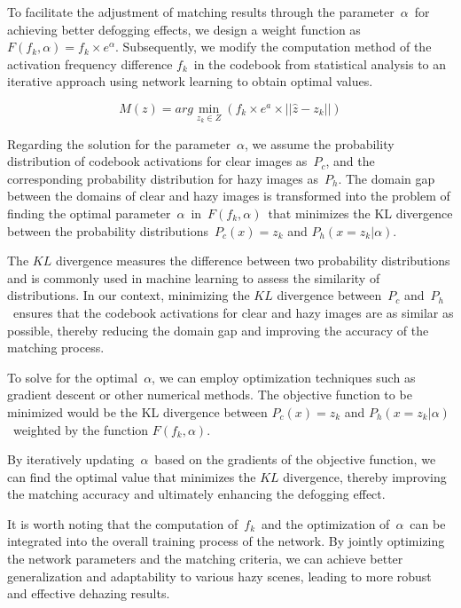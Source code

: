 \documentclass[lettersize,journal]{IEEEtran}
\begin{document}
To facilitate the adjustment of matching results through the parameter $\alpha$ for achieving better defogging effects, we design a weight function as $F(f_{k}, \alpha) = f_{k} \times e^{\alpha} $. Subsequently, we modify the computation method of the activation frequency difference $f_{k}$ in the codebook from statistical analysis to an iterative approach using network learning to obtain optimal values.

\begin{equation}
	\label{codebook_matching_equation_1}
	M(z) = arg \min_{z_{k} \in Z} (f_{k} \times e^{a} \times || \widehat{z} - z_{k} ||)
\end{equation}

Regarding the solution for the parameter $\alpha$, we assume the probability distribution of codebook activations for clear images as $P_{c}$, and the corresponding probability distribution for hazy images as $P_{h}$. The domain gap between the domains of clear and hazy images is transformed into the problem of finding the optimal parameter $\alpha$ in $F(f_{k}, \alpha)$ that minimizes the KL divergence between the probability distributions $P_{c}(x) = z_{k}$ and $P_{h}(x = z_{k} | \alpha) $.


The $KL$ divergence measures the difference between two probability distributions and is commonly used in machine learning to assess the similarity of distributions. In our context, minimizing the $KL$ divergence between $P_{c}$ and $P_{h}$ ensures that the codebook activations for clear and hazy images are as similar as possible, thereby reducing the domain gap and improving the accuracy of the matching process.

To solve for the optimal $\alpha$, we can employ optimization techniques such as gradient descent or other numerical methods. The objective function to be minimized would be the KL divergence between $P_{c}(x) = z_{k}$ and $P_{h}(x = z_{k} | \alpha) $ weighted by  the function $F(f_{k}, \alpha)$.

By iteratively updating $\alpha$ based on the gradients of the objective function, we can find the optimal value that minimizes the $KL$ divergence, thereby improving the matching accuracy and ultimately enhancing the defogging effect.

It is worth noting that the computation of $f_{k}$ and the optimization of $\alpha$ can be integrated into the overall training process of the network. By jointly optimizing the network parameters and the matching criteria, we can achieve better generalization and adaptability to various hazy scenes, leading to more robust and effective dehazing results.
\end{document}
